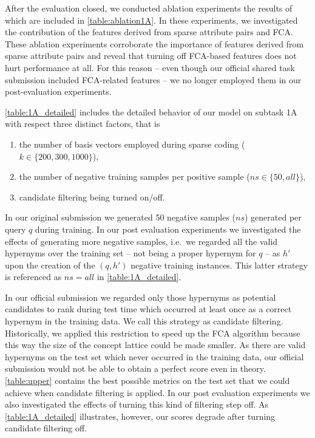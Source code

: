 \documentclass[11pt,a4paper]{article}
\begin{document}




After the evaluation closed, we conducted ablation experiments the results of 
which are included in
\autoref{table:ablation1A}. In these experiments, we investigated the 
contribution of the features derived from sparse attribute pairs and FCA.
These ablation experiments corroborate the importance of features derived 
from sparse attribute pairs and reveal that turning off FCA-based features 
does not hurt performance at all. For this reason -- even though our official 
shared task submission included FCA-related features -- we no longer employed 
them in our post-evaluation experiments.

\autoref{table:1A_detailed} includes the detailed behavior of our model on 
subtask 1A with respect three distinct factors, that is
\begin{enumerate}
	\item the number of basis vectors employed during sparse coding ($k \in 
	\{200, 300, 1000\}$),
	\item the number of negative training samples per positive sample ($ns 
	\in \{50, all\}$),
	\item candidate filtering being turned on/off.
\end{enumerate}
In our original submission we generated 50 negative samples ($ns$) generated 
per query $q$ during training. In our post evaluation experiments we 
investigated the effects of generating more negative samples, i.e.~we regarded 
all the valid hypernyms over the training set -- not being a
proper hypernym for $q$ -- as $h'$ upon the creation of the $(q, h')$ negative 
training instances. This latter strategy is referenced as $ns=all$ in 
\autoref{table:1A_detailed}.

In our official submission we regarded only those hypernyms as potential 
candidates to rank during test time which occurred at least once as a correct 
hypernym in the training data. We call this strategy as candidate filtering. 
Historically, we applied this restriction to speed up the FCA algorithm because 
this way the size of the concept lattice could be made smaller.
As there are valid hypernyms on the test set which never occurred in the 
training data, our official submission would not be able to obtain a perfect 
score even in theory. \autoref{table:upper} contains the best possible metrics 
on the test set that we could achieve when candidate filtering is applied. In 
our post evaluation experiments we also investigated the effects of turning 
this kind of filtering step off. As \autoref{table:1A_detailed} illustrates, 
however, our scores degrade after turning candidate filtering off.
\end{document}
